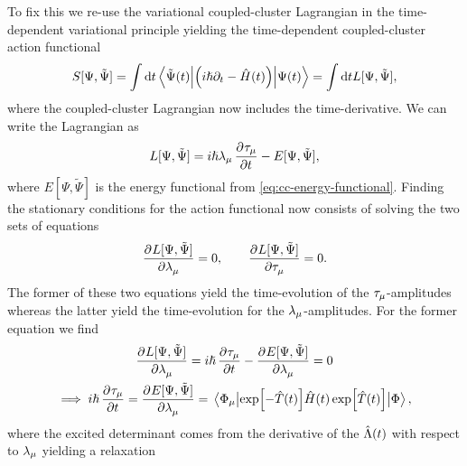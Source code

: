         To fix this we re-use the variational coupled-cluster Lagrangian in the
        time-dependent variational principle yielding the time-dependent
        coupled-cluster action functional \cite{kvaal2013variational}
        \begin{align}
            S[\Psi, \tilde{\Psi}]
            = \int\dd t
            \mel{\tilde{\Psi}(t)}{
                \left( 
                    i\hslash\partial_t
                    - \hat{H}(t)
                 \right)
            }{\Psi(t)}
            = \int\dd t
            L[\Psi, \tilde{\Psi}],
            \label{eq:cc-action-functional}
        \end{align}
        where the coupled-cluster Lagrangian now includes the time-derivative.
        We can write the Lagrangian as
        \begin{align}
            L[\Psi, \tilde{\Psi}]
            = i\hslash \clustlamp_{\mu}\dpd{\clustamp_{\mu}}{t}
            - E[\Psi, \tilde{\Psi}],
        \end{align}
        where $E[\Psi, \tilde{\Psi}]$ is the energy functional from
        \autoref{eq:cc-energy-functional}.
        Finding the stationary conditions for the action functional now consists
        of solving the two sets of equations
        \begin{align}
            \dpd{L[\Psi, \tilde{\Psi}]}{\clustlamp_{\mu}} = 0,
            \qquad
            \dpd{L[\Psi, \tilde{\Psi}]}{\clustamp_{\mu}} = 0.
        \end{align}
        The former of these two equations yield the time-evolution of the
        $\tau_{\mu}$-amplitudes whereas the latter yield the
        time-evolution for the $\lambda_{\mu}$-amplitudes.
        For the former equation we find
        \begin{gather}
            \dpd{L[\Psi, \tilde{\Psi}]}{\clustlamp_{\mu}}
            =
            i\hslash\dpd{\clustamp_{\mu}}{t}
            - \dpd{E[\Psi, \tilde{\Psi}]}{\clustlamp_{\mu}}
            = 0
            \\
            \implies
            i\hslash\dpd{\clustamp_{\mu}}{t}
            =
            \dpd{E[\Psi, \tilde{\Psi}]}{\clustlamp_{\mu}}
            =
            \mel{\slat_{\mu}}{
                \exp[-\clust(t)]
                \hamil(t)
                \exp[\clust(t)]
            }{\slat},
            \label{eq:time-evolution-tau}
        \end{gather}
        where the excited determinant comes from the derivative of the
        $\hat{\Lambda}(t)$ with respect to $\lambda_{\mu}$ yielding a relaxation

